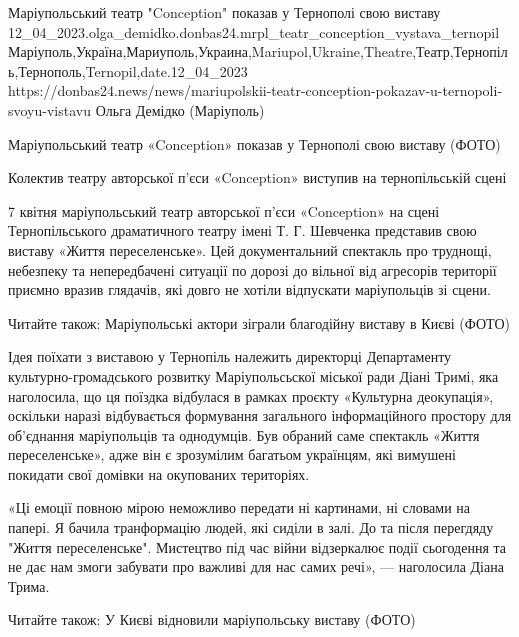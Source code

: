  
 
 
 
 
Маріупольський театр "Conception" показав у Тернополі свою виставу
12_04_2023.olga_demidko.donbas24.mrpl_teatr_conception_vystava_ternopil
Маріуполь,Україна,Мариуполь,Украина,Mariupol,Ukraine,Theatre,Театр,Тернопіль,Тернополь,Ternopil,date.12_04_2023
https://donbas24.news/news/mariupolskii-teatr-conception-pokazav-u-ternopoli-svoyu-vistavu
Ольга Демідко (Маріуполь)

Маріупольський театр «Conception» показав у Тернополі свою виставу (ФОТО)

Колектив театру авторської п'єси «Conception» виступив на тернопільській сцені

7 квітня маріупольський театр авторської п'єси «Conception» на сцені
Тернопільського драматичного театру імені Т. Г. Шевченка представив свою
виставу «Життя переселенське». Цей документальний спектакль про труднощі,
небезпеку та непередбачені ситуації по дорозі до вільної від агресорів
території приємно вразив глядачів, які довго не хотіли відпускати маріупольців
зі сцени.

Читайте також: Маріупольські актори зіграли благодійну виставу в Києві (ФОТО)

Ідея поїхати з виставою у Тернопіль належить директорці Департаменту
культурно-громадського розвитку Маріупольсьскої міської ради Діані Тримі, яка
наголосила, що ця поїздка відбулася в рамках проєкту «Культурна деокупація»,
оскільки наразі відбувається формування загального інформаційного простору для
об'єднання маріупольців та однодумців. Був обраний саме спектакль «Життя
переселенське», адже він є зрозумілим багатьом українцям, які вимушені покидати
свої домівки на окупованих територіях.

«Ці емоції повною мірою неможливо передати ні картинами, ні словами на папері.
Я бачила транформацію людей, які сиділи в залі. До та після перегдяду "Життя
переселенське". Мистецтво під час війни відзеркалює події сьогодення та не дає
нам змоги забувати про важливі для нас самих речі», — наголосила Діана Трима.

Читайте також: У Києві відновили маріупольську виставу (ФОТО)

